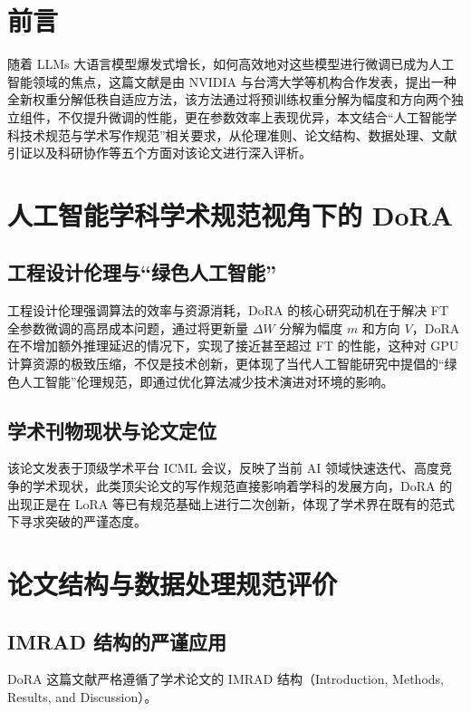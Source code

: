 \documentclass[12pt, hyperref, a4paper, UTF8]{ctexart}
\begin{document}
\cover
\thispagestyle{empty}
\clearpage
\setcounter{page}{1}



\section*{前言}
随着 LLMs 大语言模型爆发式增长，如何高效地对这些模型进行微调已成为人工智能领域的焦点，这篇文献是由 NVIDIA 与台湾大学等机构合作发表，提出一种全新权重分解低秩自适应方法，该方法通过将预训练权重分解为幅度和方向两个独立组件，不仅提升微调的性能，更在参数效率上表现优异，本文结合“人工智能学科技术规范与学术写作规范”相关要求，从伦理准则、论文结构、数据处理、文献引证以及科研协作等五个方面对该论文进行深入评析。



\section{人工智能学科学术规范视角下的 DoRA}
\subsection{工程设计伦理与“绿色人工智能”}
工程设计伦理强调算法的效率与资源消耗，DoRA 的核心研究动机在于解决 FT 全参数微调的高昂成本问题，通过将更新量 $\Delta W$ 分解为幅度 $m$ 和方向 $V$，DoRA 在不增加额外推理延迟的情况下，实现了接近甚至超过 FT 的性能，这种对 GPU 计算资源的极致压缩，不仅是技术创新，更体现了当代人工智能研究中提倡的“绿色人工智能”伦理规范，即通过优化算法减少技术演进对环境的影响。



\subsection{学术刊物现状与论文定位}
该论文发表于顶级学术平台 ICML 会议，反映了当前 AI 领域快速迭代、高度竞争的学术现状，此类顶尖论文的写作规范直接影响着学科的发展方向，DoRA 的出现正是在 LoRA 等已有规范基础上进行二次创新，体现了学术界在既有的范式下寻求突破的严谨态度。



\section{论文结构与数据处理规范评价}
\subsection{IMRAD 结构的严谨应用}
DoRA 这篇文献严格遵循了学术论文的 IMRAD 结构（Introduction, Methods, Results, and Discussion）。
\end{document}
